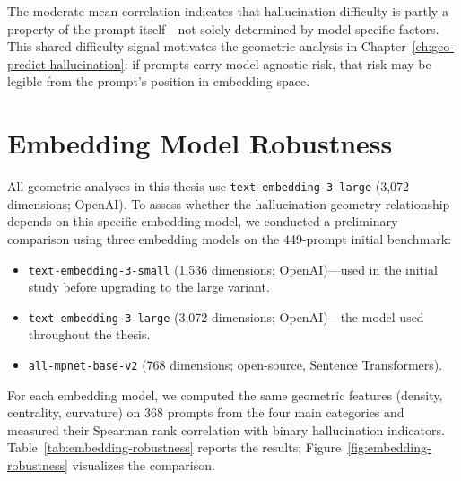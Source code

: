 The moderate mean correlation indicates that hallucination difficulty is partly a property of the prompt itself---not solely determined by model-specific factors. This shared difficulty signal motivates the geometric analysis in Chapter~\ref{ch:geo-predict-hallucination}: if prompts carry model-agnostic risk, that risk may be legible from the prompt's position in embedding space.

\section{Embedding Model Robustness}
\label{app:embedding-robustness}

All geometric analyses in this thesis use \texttt{text-embedding-3-large} (3,072 dimensions; OpenAI). To assess whether the hallucination-geometry relationship depends on this specific embedding model, we conducted a preliminary comparison using three embedding models on the 449-prompt initial benchmark:

\begin{itemize}[nosep]
    \item \texttt{text-embedding-3-small} (1,536 dimensions; OpenAI)---used in the initial study before upgrading to the large variant.
    \item \texttt{text-embedding-3-large} (3,072 dimensions; OpenAI)---the model used throughout the thesis.
    \item \texttt{all-mpnet-base-v2} (768 dimensions; open-source, Sentence Transformers).
\end{itemize}

For each embedding model, we computed the same geometric features (density, centrality, curvature) on 368 prompts from the four main categories and measured their Spearman rank correlation with binary hallucination indicators. Table~\ref{tab:embedding-robustness} reports the results; Figure~\ref{fig:embedding-robustness} visualizes the comparison.

